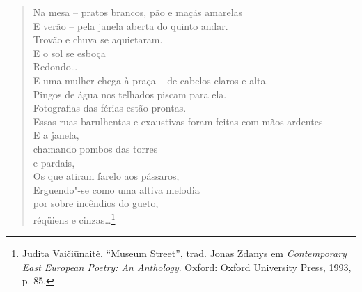 \begin{verse}
Na mesa -- pratos brancos, pão e maçãs amarelas\\
E verão -- pela janela aberta do quinto andar.\\
Trovão e chuva se aquietaram.\\
\quad E o sol se esboça\\
Redondo\ldots{}\\
E uma mulher chega à praça -- de cabelos claros e \qb{}alta.\\
Pingos de água nos telhados piscam para ela.\\
Fotografias das férias estão prontas.\\
Essas ruas barulhentas e exaustivas foram feitas \qb{}com mãos ardentes --\\
E a janela,\\
\quad chamando pombos das torres\\
\quad \quad e pardais,\\
Os que atiram farelo aos pássaros,\\
Erguendo"-se como uma altiva melodia\\
\quad por sobre incêndios do gueto,\\
\quad \quad réqüiens e cinzas\ldots{}\footnote{Judita Vaičiūnaitė, ``Museum Street'', trad. Jonas Zdanys em \textit{Contemporary East European Poetry: An Anthology}. Oxford: Oxford University Press, 1993, p. 85.} 
\end{verse}

